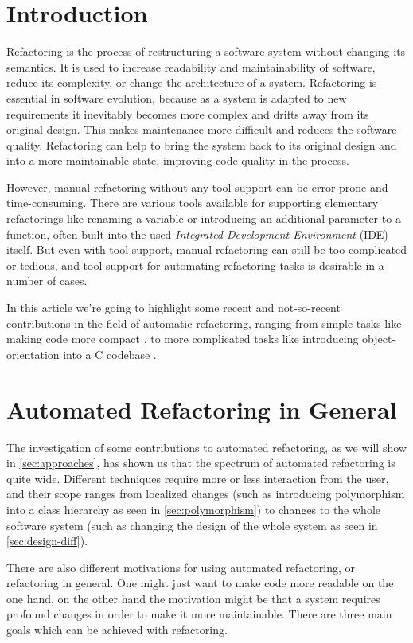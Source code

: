 \documentclass[conference,compsoc,a4paper]{IEEEtran}
\begin{document}
\section{Introduction}

Refactoring is the process of restructuring a software system without changing its semantics. It is used to increase 
readability and maintainability of software, reduce its complexity, or change the architecture of a system. Refactoring 
is essential in software evolution, because as a system is adapted to new requirements it inevitably becomes more 
complex and drifts away from its original design. This makes maintenance more difficult and reduces the software 
quality. Refactoring can help to bring the system back to its original design and into a more maintainable state, 
improving code quality in the process.

However, manual refactoring without any tool support can be error-prone and time-consuming. There are various tools 
available for supporting elementary refactorings like renaming a variable or introducing an additional parameter to a 
function, often built into the used \emph{Integrated Development Environment} (IDE) itself. But even with tool support, 
manual refactoring can still be too complicated or tedious, and tool support for automating refactoring tasks is 
desirable in a number of cases.

In this article we're going to highlight some recent and not-so-recent contributions in the field of automatic 
refactoring, ranging from simple tasks like making code more compact \cite{sparta}, to more complicated tasks like 
introducing object-orientation into a C codebase \cite{cpp}.


\section{Automated Refactoring in General} \label{sec:general}

The investigation of some contributions to automated refactoring, as we will show in \autoref{sec:approaches}, has 
shown us that the spectrum of automated refactoring is quite wide. Different techniques require more or less 
interaction from the user, and their scope ranges from localized changes (such as introducing polymorphism into a class 
hierarchy as seen in \autoref{sec:polymorphism}) to changes to the whole software system (such as changing the design 
of the whole system as seen in \autoref{sec:design-diff}).

There are also different motivations for using automated refactoring, or refactoring in general. One might just want to 
make code more readable on the one hand, on the other hand the motivation might be that a system requires profound 
changes in order to make it more maintainable. There are three main goals which can be achieved with 
refactoring.
\end{document}
